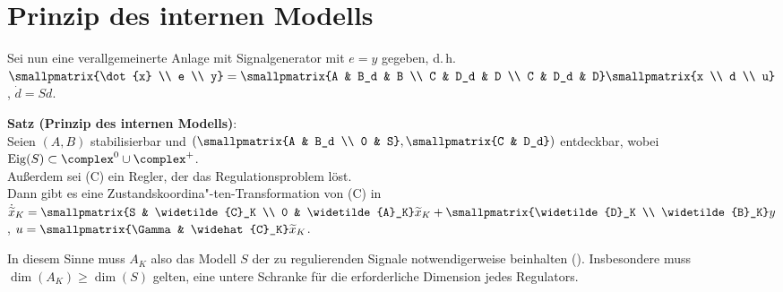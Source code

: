 \pagebreak

\section{%
    Prinzip des internen Modells%
}

Sei nun eine verallgemeinerte Anlage mit Signalgenerator mit $e = y$ gegeben, d.\,h.\\
$\smallpmatrix{\dot{x} \\ e \\ y} = \smallpmatrix{A & B_d & B \\ C & D_d & D \\ C & D_d & D}
\smallpmatrix{x \\ d \\ u}$, $\dot{d} = Sd$.

\textbf{Satz (Prinzip des internen Modells)}:\\
Seien $(A, B)$ stabilisierbar und
$\left(\smallpmatrix{A & B_d \\ 0 & S}, \smallpmatrix{C & D_d}\right)$ entdeckbar,
wobei $\Eig(S) \subset \complex^0 \cup \complex^+$.\\
Außerdem sei (C) ein Regler, der das Regulationsproblem löst.\\
Dann gibt es eine Zustandskoordina"-ten-Transformation von (C) in\\
$\dot{\widetilde{x}}_K = \smallpmatrix{S & \widetilde{C}_K \\ 0 & \widetilde{A}_K} \widetilde{x}_K
+ \smallpmatrix{\widetilde{D}_K \\ \widetilde{B}_K} y$,
$u = \smallpmatrix{\Gamma & \widehat{C}_K} \widetilde{x}_K$.

In diesem Sinne muss $A_K$ also das Modell $S$ der zu regulierenden Signale
notwendigerweise beinhalten
().
Insbesondere muss $\dim(A_K) \ge \dim(S)$ gelten, eine untere Schranke für die erforderliche
Dimension jedes Regulators.

\linie


